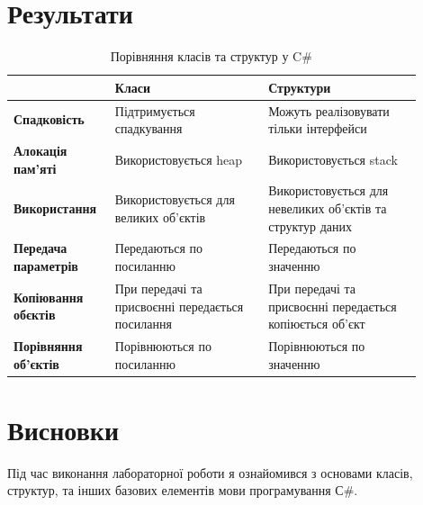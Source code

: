 \documentclass[oneside,14pt]{extarticle}
\begin{document}
\begin{normalsize}
	\section*{Результати}
	\begin{table}[h]
		\centering
		\renewcommand*\arraystretch{1.3}
		\begin{tabular}{|p{0.20\linewidth}|p{0.35\linewidth}|p{0.35\linewidth}|}
			\hline
			& \textbf{Класи} & \textbf{Структури}\\
			\hline
			\textbf{Спадковість} & Підтримується спадкування & Можуть реалізовувати тільки інтерфейси \\
			\hline
			\textbf{Алокація пам'яті} & Використовується heap & Використовується stack\\ 
			\hline
			\textbf{Використання} & Використовується для великих об'єктів & Використовується для невеликих об'єктів та структур даних \\ 
			\hline
			\textbf{Передача параметрів} & Передаються по посиланню & Передаються по значенню \\ 
			\hline
			\textbf{Копіювання обєктів} & При передачі та присвоєнні передається посилання & При передачі та присвоєнні передається копіюється об'єкт \\
			\hline
			\textbf{Порівняння об'єктів} & Порівнюються по посиланню & Порівнюються по значенню \\
			\hline
		\end{tabular}
		\caption{Порівняння класів та структур у C\#}
	\end{table}

	\section*{Висновки}
	Під час виконання лабораторної роботи я ознайомився з основами класів, структур, та інших базових елементів мови програмування С\#.
	    
\end{normalsize}
\end{document}
